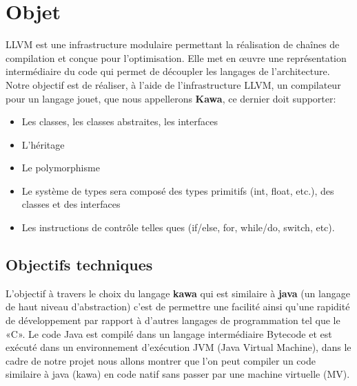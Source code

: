 \documentclass{../res/univ-projet}
\begin{document}
\maketitle
\newpage
\tableofcontents
\newpage

\section{Objet}

LLVM est une infrastructure modulaire permettant la réalisation de chaînes de compilation et conçue pour l'optimisation. Elle met en œuvre une représentation intermédiaire du code qui permet de découpler les langages de l'architecture. Notre objectif est de réaliser, à l'aide de l'infrastructure LLVM, un compilateur pour un langage jouet, que nous appellerons \textbf {Kawa}, ce dernier doit supporter:
\begin{itemize}
\item	Les classes, les classes abstraites, les interfaces
\item   L'héritage
\item   Le polymorphisme
\item   Le système de types sera composé des types primitifs (int, float, etc.), des classes et des interfaces
\item   Les instructions de contrôle telles ques (if/else, for, while/do, switch, etc).
\end{itemize}


\subsection{Objectifs techniques}
L'objectif à travers le choix du langage \textbf {kawa} qui est similaire  à \textbf {java} (un langage de haut niveau d'abstraction) c'est de permettre une facilité ainsi qu'une rapidité de développement par rapport à d'autres langages de programmation tel que le «C». Le code Java  est compilé dans un langage intermédiaire  Bytecode et est exécuté dans un environnement d'exécution JVM (Java Virtual Machine), dans le cadre de notre projet nous allons montrer que l'on peut compiler un code similaire à java (kawa) en code natif sans passer par une machine virtuelle (MV).
\end{document}
